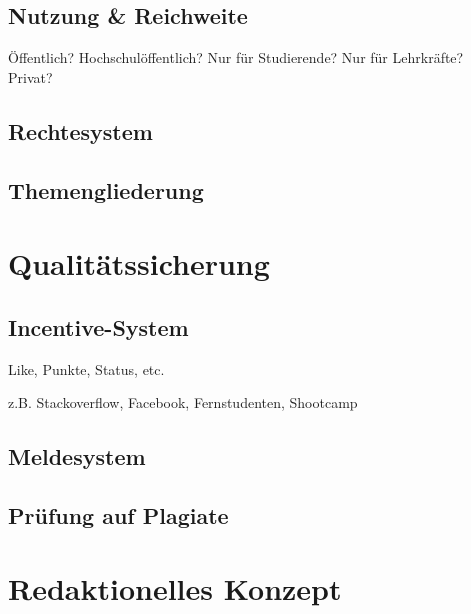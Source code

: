 \subsection{Nutzung \& Reichweite} %
\label{sub:reichweite}
Öffentlich? Hochschulöffentlich? Nur für Studierende? Nur für Lehrkräfte? Privat?

\subsection{Rechtesystem} %
\label{sub:rechtesystem}


\subsection{Themengliederung} %
\label{sub:themengliederung}



\section{Qualitätssicherung} %
\label{sec:qualitatssicherung}

\subsection{Incentive-System} %
\label{sub:incentive_system}
Like, Punkte, Status, etc.

z.B. Stackoverflow, Facebook, Fernstudenten, Shootcamp

\subsection{Meldesystem} %
\label{sub:meldesystem}


\subsection{Prüfung auf Plagiate} %
\label{sub:prufung_auf_plagiate}



\section{Redaktionelles Konzept} %
\label{sec:redaktionelles_konzept}
